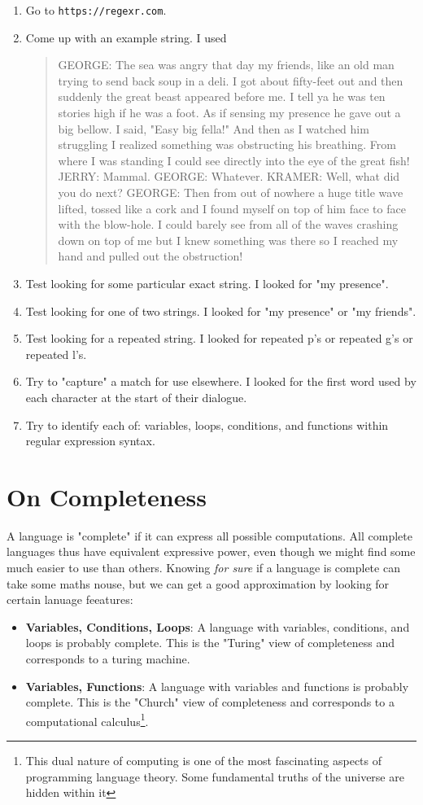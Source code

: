 \documentclass[twoside=false, DIV=14]{scrartcl}
\begin{document}
\begin{enumerate}
  \item Go to \verb+https://regexr.com+.
  \item Come up with an example string.  I used {\tiny \begin{quote} GEORGE: The sea was angry that day my friends, like an old man trying to send back soup in a deli. I got about fifty-feet out and then suddenly the great beast appeared before me. I tell ya he was ten stories high if he was a foot. As if sensing my presence he gave out a big bellow. I said, "Easy big fella!" And then as I watched him struggling I realized something was obstructing his breathing. From where I was standing I could see directly into the eye of the great fish! JERRY: Mammal. GEORGE: Whatever. KRAMER: Well, what did you do next? GEORGE: Then from out of nowhere a huge title wave lifted, tossed like a cork and I found myself on top of him face to face with the blow-hole. I could barely see from all of the waves crashing down on top of me but I knew something was there so I reached my hand and pulled out the obstruction!\end{quote}}
  \item Test looking for some particular exact string.  I looked for "my presence".
  \item Test looking for one of two strings. I looked for "my presence" or "my friends".
  \item Test looking for a repeated string.  I looked for repeated p's or repeated g's or repeated l's.
  \item Try to "capture" a match for use elsewhere.  I looked for the first word used by each character at the start of their dialogue.
  \item Try to identify each of: variables, loops, conditions, and functions within regular expression syntax.
\end{enumerate}

\section*{On Completeness}
A language is "complete" if it can express all possible computations.  All complete languages thus have equivalent expressive power, even though we might find some much easier to use than others.  Knowing \emph{for sure} if a language is complete can take some maths nouse, but we can get a good approximation by looking for certain lanuage feeatures:
\begin{itemize}
  \item \textbf{Variables, Conditions, Loops}: A language with variables, conditions, and loops is probably complete.  This is the "Turing" view of completeness and corresponds to a turing machine.
  \item \textbf{Variables, Functions}: A language with variables and functions is probably complete.  This is the "Church" view of completeness and corresponds to a computational calculus\footnote{This dual nature of computing is one of the most fascinating aspects of programming language theory.  Some fundamental truths of the universe are hidden within it}.
\end{itemize}
\end{document}
